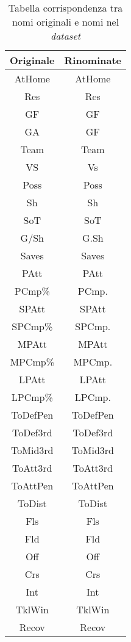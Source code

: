 \begin{table}[!htb]%
	
	\renewcommand{\arraystretch}{1.7}
	\centering
	\begin{tabular}{c c }
		\hline	
		\rowcolor{SchoolColor2}
		\textbf{Originale} & \textbf{Rinominate} \\	
		\hline			
		AtHome & AtHome \\
		Res & Res \\
		GF & GF\\
		GA & GF \\
		Team & Team \\
		VS & Vs\\
		Poss & Poss\\
		Sh & Sh\\
		SoT & SoT\\
		G/Sh & G.Sh \\
		Saves & Saves \\
		PAtt & PAtt \\
		PCmp\% & PCmp.\\
		SPAtt & SPAtt \\
		SPCmp\% & SPCmp.\\
		MPAtt & MPAtt \\
		MPCmp\% & MPCmp.\\
		LPAtt & LPAtt \\
		LPCmp\% & LPCmp. \\
		ToDefPen & ToDefPen \\
		ToDef3rd & ToDef3rd \\
		ToMid3rd & ToMid3rd \\
		ToAtt3rd & ToAtt3rd \\
		ToAttPen & ToAttPen \\
		ToDist & ToDist\\
		Fls & Fls \\
		Fld & Fld \\
		Off & Off \\
		Crs & Crs \\
		Int & Int \\
		TklWin & TklWin \\
		Recov & Recov \\
		\hline
		
	\end{tabular} \hbox{}
	
	\caption{Tabella corrispondenza tra nomi originali e nomi nel \emph{dataset}} \label{tab:summary2}
\end{table}
